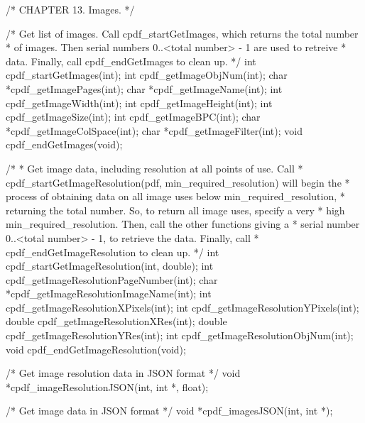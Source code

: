 /* CHAPTER 13. Images. */

/* Get list of images. Call cpdf_startGetImages, which returns the total number
 * of images. Then serial numbers 0..<total number> - 1 are used to retreive
 * data. Finally, call cpdf_endGetImages to clean up. */
int cpdf_startGetImages(int);
int cpdf_getImageObjNum(int);
char *cpdf_getImagePages(int);
char *cpdf_getImageName(int);
int cpdf_getImageWidth(int);
int cpdf_getImageHeight(int);
int cpdf_getImageSize(int);
int cpdf_getImageBPC(int);
char *cpdf_getImageColSpace(int);
char *cpdf_getImageFilter(int);
void cpdf_endGetImages(void);

/*
 * Get image data, including resolution at all points of use. Call
 * cpdf_startGetImageResolution(pdf, min_required_resolution) will begin the
 * process of obtaining data on all image uses below min_required_resolution,
 * returning the total number. So, to return all image uses, specify a very
 * high min_required_resolution. Then, call the other functions giving a
 * serial number 0..<total number> - 1, to retrieve the data. Finally, call
 * cpdf_endGetImageResolution to clean up.
 */
int cpdf_startGetImageResolution(int, double);
int cpdf_getImageResolutionPageNumber(int);
char *cpdf_getImageResolutionImageName(int);
int cpdf_getImageResolutionXPixels(int);
int cpdf_getImageResolutionYPixels(int);
double cpdf_getImageResolutionXRes(int);
double cpdf_getImageResolutionYRes(int);
int cpdf_getImageResolutionObjNum(int);
void cpdf_endGetImageResolution(void);

/* Get image resolution data in JSON format */
void *cpdf_imageResolutionJSON(int, int *, float);

/* Get image data in JSON format */
void *cpdf_imagesJSON(int, int *);

